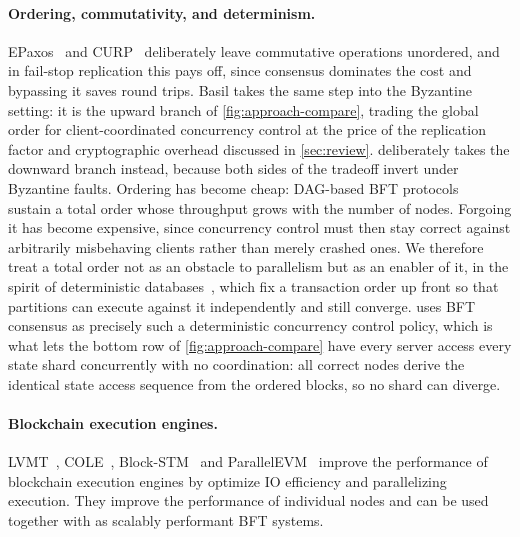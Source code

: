 \paragraph{Ordering, commutativity, and determinism.}
EPaxos~\cite{epaxos} and CURP~\cite{curp} deliberately leave commutative operations unordered, and in fail-stop replication this pays off, since consensus dominates the cost and bypassing it saves round trips.
Basil takes the same step into the Byzantine setting: it is the upward branch of \cref{fig:approach-compare}, trading the global order for client-coordinated concurrency control at the price of the replication factor and cryptographic overhead discussed in \cref{sec:review}.
\sys deliberately takes the downward branch instead, because both sides of the tradeoff invert under Byzantine faults.
Ordering has become cheap: DAG-based BFT protocols~\cite{narwhal,bullshark,mysticeti,giridharan2024autobahn} sustain a total order whose throughput grows with the number of nodes.
Forgoing it has become expensive, since concurrency control must then stay correct against arbitrarily misbehaving clients rather than merely crashed ones.
We therefore treat a total order not as an obstacle to parallelism but as an enabler of it, in the spirit of deterministic databases~\cite{calvin,aria}, which fix a transaction order up front so that partitions can execute against it independently and still converge.
\sys uses BFT consensus as precisely such a deterministic concurrency control policy, which is what lets the bottom row of \cref{fig:approach-compare} have every server access every state shard concurrently with no coordination: all correct nodes derive the identical state access sequence from the ordered blocks, so no shard can diverge.

\paragraph{Blockchain execution engines.}
LVMT~\cite{li2024lvmt}, COLE~\cite{zhang2024cole}, Block-STM~\cite{gelashvili2022blockstm} and ParallelEVM~\cite{lin2025parallelevm} improve the performance of blockchain execution engines by optimize IO efficiency and parallelizing execution.
They improve the performance of individual nodes and can be used together with \sys as scalably performant BFT systems.
